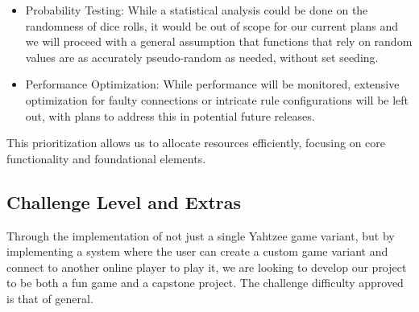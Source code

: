 \documentclass[12pt, titlepage]{article}
\begin{document}
\begin{itemize}
	\item Probability Testing: While a statistical analysis could be done on the randomness of dice rolls, it would be out of scope for our current plans and we will proceed with a general assumption that functions that rely on random values are as accurately pseudo-random as needed, without set seeding.
	\item Performance Optimization: While performance will be monitored, extensive optimization for faulty connections or intricate rule configurations will be left out, with plans to address this in potential future releases.
\end{itemize}

This prioritization allows us to allocate resources efficiently, focusing on core functionality and foundational elements.

\subsection{Challenge Level and Extras}

\iffalse
\wss{State the challenge level (advanced, general, basic) for your project.
Your challenge level should exactly match what is included in your problem
statement.  This should be the challenge level agreed on between you and the
course instructor.  You can use a pull request to update your challenge level
(in TeamComposition.csv or Repos.csv) if your plan changes as a result of the
VnV planning exercise.}

\wss{Summarize the extras (if any) that were tackled by this project.  Extras
can include usability testing, code walkthroughs, user documentation, formal
proof, GenderMag personas, Design Thinking, etc.  Extras should have already
been approved by the course instructor as included in your problem statement.
You can use a pull request to update your extras (in TeamComposition.csv or
Repos.csv) if your plan changes as a result of the VnV planning exercise.}
\fi

Through the implementation of not just a single Yahtzee game variant, but by implementing a system where the user can create a custom game variant and connect to another online player to play it, we are looking to develop our project to be both a fun game and a capstone project. The challenge difficulty approved is that of general.

\iffalse
, we are looking to achieve the advanced challenge level. We would also provide some pre-set game variants that have been tested and were found to be more fun than others.
\fi
\end{document}
